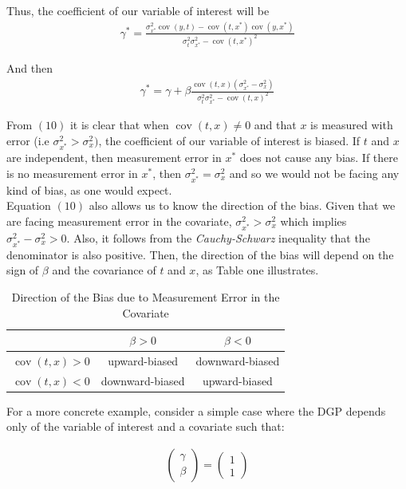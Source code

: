 \documentclass[12pt]{article}
\def\b{\beta}
\begin{document}
	Thus, the coefficient of our variable of interest will be
	\begin{align}
	{\gamma}^* =\frac{\sigma_{x^*}^2\operatorname{cov}{(y,t)}-\operatorname{cov}({t,x^*})\operatorname{cov}{(y,x^*)}}{\sigma_{t}^2\sigma_{x^*}^2-\operatorname{cov}({t,x^*})^2}
\end{align}

And then
\begin{align}
    \gamma^* = \gamma + \beta\frac{\operatorname{cov}(t,x)(\sigma^2_{x^*}-\sigma^2_x)}{\sigma_{t}^2\sigma_{x^*}^2-\operatorname{cov}({t,x})^2}
\end{align}

From $(10)$ it is clear that when $\operatorname{cov}(t,x)\neq 0$ and that $x$ is measured with error (i.e $\sigma_{x^*}^2>\sigma_x^2)$, the coefficient of our variable of interest is biased. If $t$ and $x$ are independent, then measurement error in $x^*$ does not cause any bias. If there is no measurement error in $x^*$, then $\sigma^2_{x^*}=\sigma^2_x$ and so we would not be facing any kind of bias, as one would expect.\\

Equation $(10)$ also allows us to know the direction of the bias. Given that we are facing measurement error in the covariate, $\sigma^2_{x^*}>\sigma^2_x$ which implies $\sigma^2_{x^*}-\sigma^2_x>0$. Also, it follows from the \textit{Cauchy-Schwarz} inequality that the denominator is also positive. Then, the direction of the bias will depend on the sign of $\beta$ and the covariance of $t$ and $x$, as Table one illustrates.

\begin{table}[h!]
    \centering
    \begin{tabular}{|c|c|c|}\hline \hline
      & $\b>0$  & $\b<0$ \\ \hline
     $\operatorname{cov}(t,x)>0$ & upward-biased & downward-biased \\ \hline
     $\operatorname{cov}(t,x)<0$ & downward-biased & upward-biased \\ \hline
    \end{tabular} 
    \caption{Direction of the Bias due to Measurement Error in the Covariate}
    \label{tab:my_label}
\end{table}

 For a more concrete example, consider a simple case where the DGP depends only of the variable of interest and a covariate such that:

\begin{align}
    \left(\begin{array}{l}
{\gamma} \\
{\beta}
\end{array}\right)=\left(\begin{array}{l}
1 \\
1
\end{array}\right)
\end{align}
\end{document}
